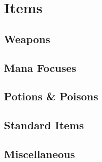 

\chapter{Items}
\section{Weapons}
\section{Mana Focuses}
\section{Potions \& Poisons}
\section{Standard Items}
\section{Miscellaneous}


